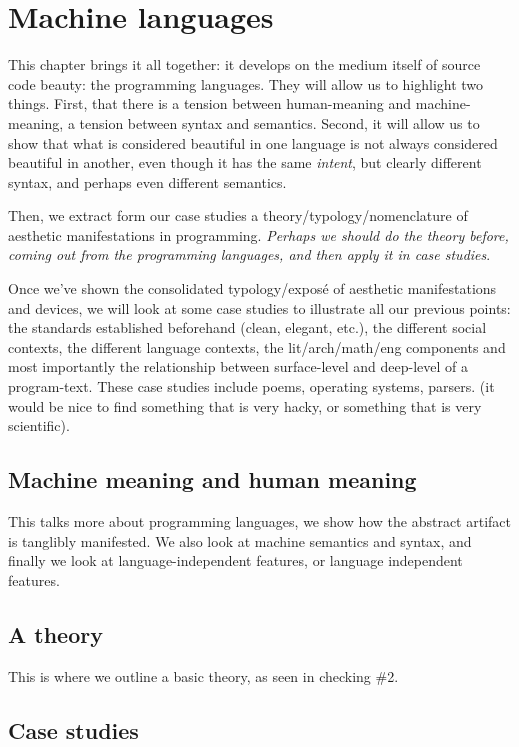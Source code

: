 \chapter{Machine languages}

This chapter brings it all together: it develops on the medium itself of source code beauty: the programming languages. They will allow us to highlight two things. First, that there is a tension between human-meaning and machine-meaning, a tension between syntax and semantics. Second, it will allow us to show that what is considered beautiful in one language is not always considered beautiful in another, even though it has the same \emph{intent}, but clearly different syntax, and perhaps even different semantics.

Then, we extract form our case studies a theory/typology/nomenclature of aesthetic manifestations in programming. \emph{Perhaps we should do the theory before, coming out from the programming languages, and then apply it in case studies}.

Once we've shown the consolidated typology/exposé of aesthetic manifestations and devices, we will look at some case studies to illustrate all our previous points: the standards established beforehand (clean, elegant, etc.), the different social contexts, the different language contexts, the lit/arch/math/eng components and most importantly the relationship between surface-level and deep-level of a program-text. These case studies include poems, operating systems, parsers. (it would be nice to find something that is very hacky, or something that is very scientific).

\section{Machine meaning and human meaning}

This talks more about programming languages, we show how the abstract artifact is tanglibly manifested. We also look at machine semantics and syntax, and finally we look at language-independent features, or language independent features.

\section{A theory}

This is where we outline a basic theory, as seen in checking \#2.

\section{Case studies}

